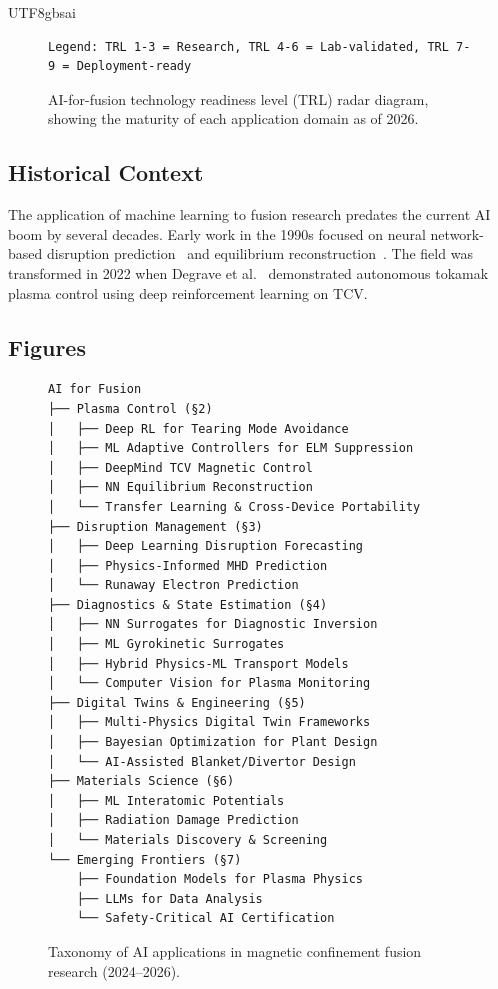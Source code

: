 \documentclass[12pt,a4paper]{article}
\begin{document}
\begin{CJK}{UTF8}{gbsai}
\begin{figure}[htbp]
\begin{verbatim}
Legend: TRL 1-3 = Research, TRL 4-6 = Lab-validated, TRL 7-9 = Deployment-ready
\end{verbatim}
\caption{AI-for-fusion technology readiness level (TRL) radar diagram, showing the maturity of each application domain as of 2026.}
\label{fig:trl-radar}
\end{figure}

\subsection{Historical Context}

The application of machine learning to fusion research predates the current AI boom by several decades. Early work in the 1990s focused on neural network-based disruption prediction~\citep{Wroblewski1997} and equilibrium reconstruction~\citep{Lao1985}. The field was transformed in 2022 when Degrave et al.~\citep{Degrave2022Nature} demonstrated autonomous tokamak plasma control using deep reinforcement learning on TCV.

\subsection{Figures}

\begin{figure}[htbp]
\centering
\small
\begin{verbatim}
AI for Fusion
├── Plasma Control (§2)
│   ├── Deep RL for Tearing Mode Avoidance
│   ├── ML Adaptive Controllers for ELM Suppression
│   ├── DeepMind TCV Magnetic Control
│   ├── NN Equilibrium Reconstruction
│   └── Transfer Learning & Cross-Device Portability
├── Disruption Management (§3)
│   ├── Deep Learning Disruption Forecasting
│   ├── Physics-Informed MHD Prediction
│   └── Runaway Electron Prediction
├── Diagnostics & State Estimation (§4)
│   ├── NN Surrogates for Diagnostic Inversion
│   ├── ML Gyrokinetic Surrogates
│   ├── Hybrid Physics-ML Transport Models
│   └── Computer Vision for Plasma Monitoring
├── Digital Twins & Engineering (§5)
│   ├── Multi-Physics Digital Twin Frameworks
│   ├── Bayesian Optimization for Plant Design
│   └── AI-Assisted Blanket/Divertor Design
├── Materials Science (§6)
│   ├── ML Interatomic Potentials
│   ├── Radiation Damage Prediction
│   └── Materials Discovery & Screening
└── Emerging Frontiers (§7)
    ├── Foundation Models for Plasma Physics
    ├── LLMs for Data Analysis
    └── Safety-Critical AI Certification
\end{verbatim}
\caption{Taxonomy of AI applications in magnetic confinement fusion research (2024--2026).}
\label{fig:taxonomy}
\end{figure}


\end{CJK}
\end{document}
